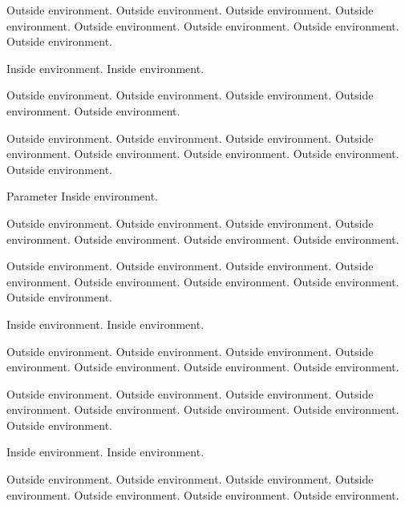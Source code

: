 \documentclass{article}
\newenvironment{bluetext}{\begin{center}\color{blue}}{\end{center}} %
\newenvironment{bluetext_1}[1]{\begin{center}\color{blue}\textbf{\textit{#1}}\\[12pt]}{\end{center}} %
\renewenvironment{itemize}{\begin{center}\large}{\end{center}} %
\newenvironment{itemizecolor}[1]{\begin{center}\color{#1}\large}{\end{center}} %
\begin{document}
Outside environment. Outside environment. Outside environment. Outside environment. 
Outside environment. Outside environment. Outside environment. Outside environment. 
\begin{bluetext}
Inside environment. Inside environment.
\end{bluetext}
Outside environment. Outside environment. Outside environment. Outside environment. Outside environment.

Outside environment. Outside environment. Outside environment. Outside environment. 
Outside environment. Outside environment. Outside environment. Outside environment. 
\begin{bluetext_1}{Parameter}
Inside environment.
\end{bluetext_1}
Outside environment. Outside environment. Outside environment. Outside environment. Outside environment. Outside environment. Outside environment.

Outside environment. Outside environment. Outside environment. Outside environment. 
Outside environment. Outside environment. Outside environment. Outside environment. 
\begin{itemize}
Inside environment. Inside environment.
\end{itemize}
Outside environment. Outside environment. Outside environment. Outside environment. Outside environment. Outside environment. Outside environment.

Outside environment. Outside environment. Outside environment. Outside environment. 
Outside environment. Outside environment. Outside environment. Outside environment. 
\begin{itemizecolor}{green}
Inside environment. Inside environment.
\end{itemizecolor}
Outside environment. Outside environment. Outside environment. Outside environment. Outside environment. Outside environment. Outside environment.
\end{document}
